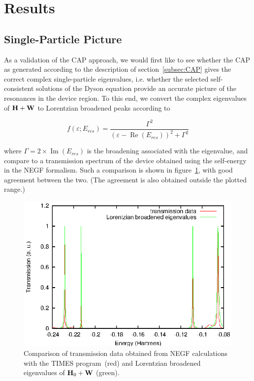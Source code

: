 \section{Results}
\label{sec:results}

\subsection{Single-Particle Picture}
\label{subsec:SingleParticle}

As a validation of the CAP approach, we would first like to see whether the
CAP as generated according to the description of section~\ref{subsec:CAP} gives
the correct complex single-particle eigenvalues, i.e. whether the selected
self-consistent solutions of the Dyson equation provide an accurate picture of
the resonances in the device region. To this end, we convert the complex
eigenvalues of $\mathbf{H} + \mathbf{W}$ to Lorentzian broadened peaks according to

\begin{equation}
	f(\varepsilon;E_{res})
	= \frac{\Gamma^2}{(\varepsilon - \operatorname{Re}(E_{res}))^2 + \Gamma^2}
	\label{eq:lobro}
\end{equation}

where $\Gamma = 2 \times \operatorname{Im}(E_{res})$ is the broadening
associated with the eigenvalue, and compare to a transmission spectrum of the
device obtained using the self-energy in the NEGF formalism. Such a comparison
is shown in figure~\ref{fig:lobro-hwevals}, with good agreement between the
two. (The agreement is also obtained outside the plotted range.)

\begin{figure}
	\begin{center}
		\includegraphics[width=0.9\linewidth]{figures/4evals}
	\end{center}
	\caption{Comparison of transmission data obtained from NEGF
	calculations with the TIMES program~\cite{times}(red) and Lorentzian
	broadened eigenvalues of $\mathbf{H}_0 + \mathbf{W}$ (green).}
	\label{fig:lobro-hwevals}
\end{figure}

